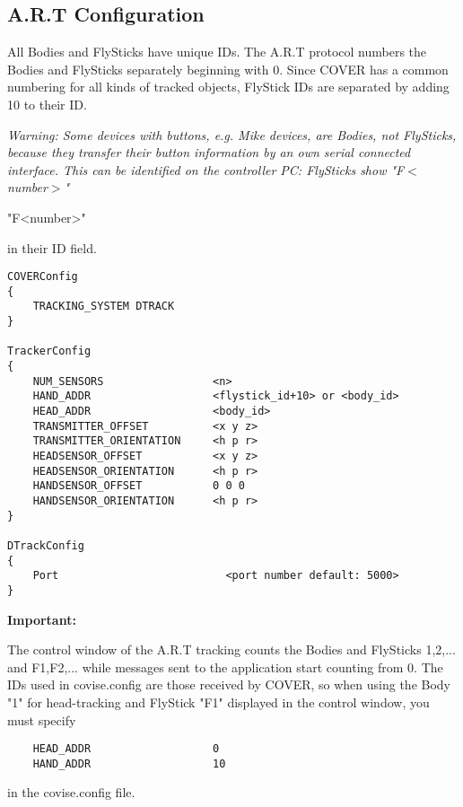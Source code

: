 \subsection{A.R.T Configuration}
All Bodies and FlySticks have unique IDs. The A.R.T protocol numbers 
the Bodies and FlySticks separately beginning with 0. Since COVER has 
a common numbering for all kinds of tracked objects, FlyStick IDs are 
separated by adding 10 to their ID. 

{\it Warning: Some devices with buttons, e.g. Mike devices, are Bodies, 
not FlySticks, because they transfer their button information by an own 
serial connected interface. This can be identified on the controller PC: 
FlySticks show 
\latexonly "F$<$number$>$"\endlatexonly \begin{htmlonly} "F<number>" \end{htmlonly}in their ID field.}

\begin{samepage}
\small \begin{verbatim}
COVERConfig
{
    TRACKING_SYSTEM DTRACK
}

TrackerConfig
{
    NUM_SENSORS                 <n>
    HAND_ADDR                   <flystick_id+10> or <body_id>
    HEAD_ADDR                   <body_id>
    TRANSMITTER_OFFSET          <x y z>
    TRANSMITTER_ORIENTATION     <h p r>     
    HEADSENSOR_OFFSET           <x y z>
    HEADSENSOR_ORIENTATION      <h p r>
    HANDSENSOR_OFFSET           0 0 0
    HANDSENSOR_ORIENTATION      <h p r>
}

DTrackConfig
{
    Port                          <port number default: 5000>
}
\end{verbatim} \normalsize
\end{samepage}

{\bf Important:}

The control window of the A.R.T tracking counts the Bodies
and FlySticks  1,2,... and F1,F2,... while messages sent to 
the application start counting from 0. The IDs used in covise.config 
are those received by COVER, so when using the Body "1" for head-tracking 
and FlyStick "F1" displayed in the control window, you must specify
\begin{samepage}
\small \begin{verbatim}
    HEAD_ADDR                   0
    HAND_ADDR                   10
\end{verbatim} \normalsize
\end{samepage}
in the covise.config file.


